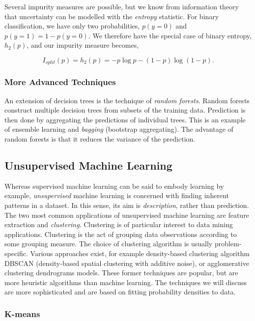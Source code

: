 \documentclass[11pt]{amsart}
\begin{document}
Several impurity measures are possible, but we know from information theory that uncertainty can be modelled with the \emph{entropy} statistic. For binary classification, we have only two probabilities, $p(y = 0)$ and $p(y=1) = 1 - p(y=0)$. We therefore have the special case of binary entropy, $h_2(p)$, and our impurity measure becomes,

$$I_{split}(p) = h_2(p) = -p\log p - (1-p)\log (1-p).$$

\subsubsection{More Advanced Techniques}

An extension of decision trees is the technique of \emph{random forests}. Random forests construct multiple decision trees from subsets of the training data. Prediction is then done by aggregating the predictions of individual trees. This is an example of ensemble learning and \emph{bagging} (bootstrap aggregating). The advantage of random forests is that it reduces the variance of the prediction.

\subsection{Unsupervised Machine Learning}

Whereas supervised machine learning can be said to embody learning by example, \emph{unsupervised} machine learning is concerned with finding inherent patterns in a dataset. In this sense, its aim is \emph{description}, rather than prediction. The two most common applications of unsupervised machine learning are feature extraction and \emph{clustering}. Clustering is of particular interest to data mining applications. Clustering is the act of grouping data observations according to some grouping measure. The choice of clustering algorithm is usually problem-specific. Various approaches exist, for example density-based clustering algorithm DBSCAN (density-based spatial clustering with additive noise), or agglomerative clustering dendrograms models. These former techniques are popular, but are more heuristic algorithms than machine learning. The techniques we will discuss are more sophisticated and are based on fitting probability densities to data.

\subsubsection{K-means}
\end{document}
